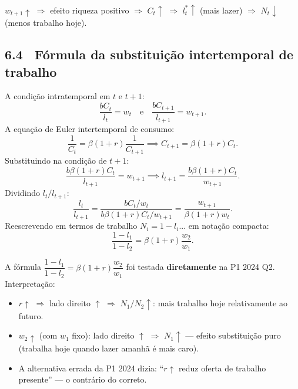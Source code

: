 \documentclass[12pt, a4paper]{article}
\begin{document}
\begin{resultbox}[title={Lazer e salário futuro (Q6b)}]
$w_{t+1}\uparrow$ $\Rightarrow$ efeito riqueza positivo $\Rightarrow$ $C_t\uparrow$
$\Rightarrow$ $l_t^*\uparrow$ (mais lazer) $\Rightarrow$ $N_t\downarrow$ (menos trabalho hoje).
\end{resultbox}

\subsection*{6.4 \ Fórmula da substituição intertemporal de trabalho}

\begin{formulabox}[title={Derivação da equação de substituição intertemporal (P1 2024 Q2)}]
A condição intratemporal em $t$ e $t+1$:
\[
\frac{bC_t}{l_t} = w_t \quad\text{e}\quad \frac{bC_{t+1}}{l_{t+1}} = w_{t+1}.
\]
A equação de Euler intertemporal de consumo:
\[
\frac{1}{C_t} = \beta(1+r)\frac{1}{C_{t+1}} \implies C_{t+1} = \beta(1+r)C_t.
\]
Substituindo na condição de $t+1$:
\[
\frac{b\beta(1+r)C_t}{l_{t+1}} = w_{t+1}
\implies l_{t+1} = \frac{b\beta(1+r)C_t}{w_{t+1}}.
\]
Dividindo $l_t/l_{t+1}$:
\[
\frac{l_t}{l_{t+1}} = \frac{bC_t/w_t}{b\beta(1+r)C_t/w_{t+1}}
= \frac{w_{t+1}}{\beta(1+r)w_t}.
\]
Reescrevendo em termos de trabalho $N_i = 1-l_i$... em notação compacta:
\begin{equation}
\boxed{
\frac{1-l_1}{1-l_2} = \beta(1+r)\frac{w_2}{w_1}.
}
\label{eq:intertemporal_labor}
\end{equation}
\end{formulabox}

\begin{provabox}[title={Atenção --- Cai na Prova (Q2 / P1 2024)}]
A fórmula $\dfrac{1-l_1}{1-l_2} = \beta(1+r)\dfrac{w_2}{w_1}$ foi testada
\textbf{diretamente} na P1 2024 Q2. Interpretação:
\begin{itemize}[leftmargin=1.5em, topsep=2pt, itemsep=2pt]
  \item $r\uparrow$ $\Rightarrow$ lado direito $\uparrow$ $\Rightarrow$ $N_1/N_2\uparrow$:
    mais trabalho hoje relativamente ao futuro.
  \item $w_2\uparrow$ (com $w_1$ fixo): lado direito $\uparrow$ $\Rightarrow$ $N_1\uparrow$
    --- efeito substituição puro (trabalha hoje quando lazer amanhã é mais caro).
  \item A alternativa errada da P1 2024 dizia: ``$r\uparrow$ reduz oferta de trabalho
    presente'' --- o contrário do correto.
\end{itemize}
\end{provabox}
\end{document}
